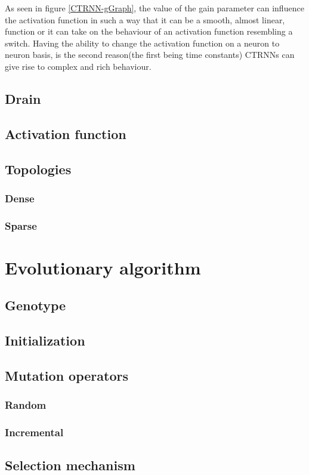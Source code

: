 As seen in figure \ref{CTRNN-gGraph}, the value of the gain parameter can influence the activation function in such a way that it can be a smooth, almost linear, function or it can take on the behaviour of an activation function resembling a switch.
Having the ability to change the activation function on a neuron to neuron basis, is the second reason(the first being time constants) CTRNNs can give rise to complex and rich behaviour.



	\subsection{Drain}
	\subsection{Activation function}
	\subsection{Topologies}
		\subsubsection{Dense}
		\subsubsection{Sparse}
\clearpage
\section{Evolutionary algorithm}
	\subsection{Genotype}
	\subsection{Initialization}
	\subsection{Mutation operators}
		\subsubsection{Random}
		\subsubsection{Incremental}
	\subsection{Selection mechanism}
\clearpage
